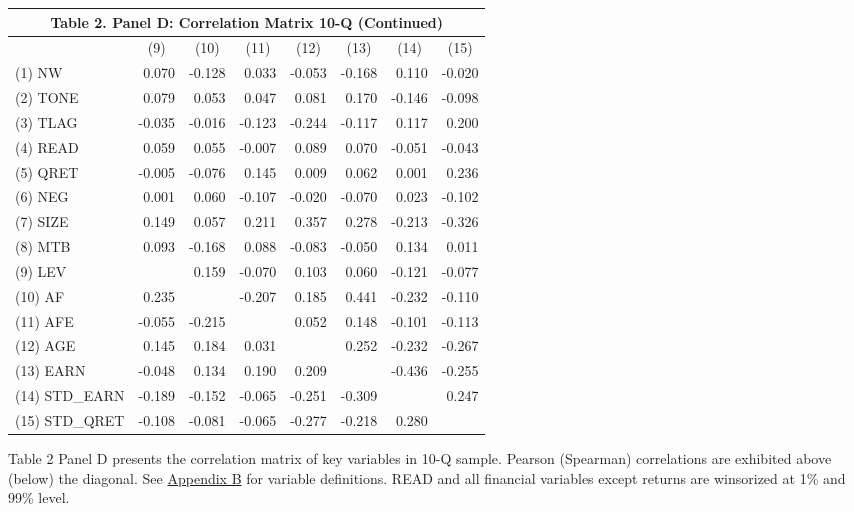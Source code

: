 \begin{table}[H]
  \begin{center}
  	\begin{tabular}{lrrrrrrr}
  		\multicolumn{8}{c}{\textbf{Table 2. Panel D: Correlation Matrix 10-Q (Continued) }} \\
  		\midrule
  		\midrule
  		& \multicolumn{1}{c}{(9)} & \multicolumn{1}{c}{(10)} & \multicolumn{1}{c}{(11)} & \multicolumn{1}{c}{(12)} & \multicolumn{1}{c}{(13)} & \multicolumn{1}{c}{(14)} & \multicolumn{1}{c}{(15)} \\
  		\midrule
  		(1) NW & 0.070 & -0.128 & 0.033 & -0.053 & -0.168 & 0.110 & -0.020 \\
  		(2) TONE & 0.079 & 0.053 & 0.047 & 0.081 & 0.170 & -0.146 & -0.098 \\
  		(3) TLAG & -0.035 & -0.016 & -0.123 & -0.244 & -0.117 & 0.117 & 0.200 \\
  		(4) READ & 0.059 & 0.055 & -0.007 & 0.089 & 0.070 & -0.051 & -0.043 \\
  		(5) QRET & -0.005 & -0.076 & 0.145 & 0.009 & 0.062 & 0.001 & 0.236 \\
  		(6) NEG & 0.001 & 0.060 & -0.107 & -0.020 & -0.070 & 0.023 & -0.102 \\
  		(7) SIZE & 0.149 & 0.057 & 0.211 & 0.357 & 0.278 & -0.213 & -0.326 \\
  		(8) MTB & 0.093 & -0.168 & 0.088 & -0.083 & -0.050 & 0.134 & 0.011 \\
  		(9) LEV &  & 0.159 & -0.070 & 0.103 & 0.060 & -0.121 & -0.077 \\
  		(10) AF & 0.235 &  & -0.207 & 0.185 & 0.441 & -0.232 & -0.110 \\
  		(11) AFE & -0.055 & -0.215 &  & 0.052 & 0.148 & -0.101 & -0.113 \\
  		(12) AGE & 0.145 & 0.184 & 0.031 &  & 0.252 & -0.232 & -0.267 \\
  		(13) EARN & -0.048 & 0.134 & 0.190 & 0.209 &  & -0.436 & -0.255 \\
  		(14) STD\_EARN & -0.189 & -0.152 & -0.065 & -0.251 & -0.309 &  & 0.247 \\
  		(15) STD\_QRET & -0.108 & -0.081 & -0.065 & -0.277 & -0.218 & 0.280 &  \\
  		\bottomrule
  		\bottomrule
  	\end{tabular}%
  \end{center}
	\begin{footnotesize}
		\noindent Table 2 Panel D presents the correlation matrix of key variables in 10-Q sample. Pearson (Spearman) correlations are exhibited above (below) the diagonal. See \hyperref[appb]{Appendix B} for variable definitions. READ and all financial variables except returns are winsorized at 1\% and 99\% level. 
	\end{footnotesize}
\end{table}%